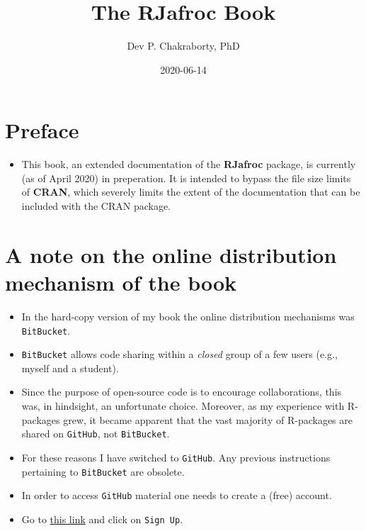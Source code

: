 \documentclass[
]{book}
\title{The RJafroc Book}
\author{Dev P. Chakraborty, PhD}
\date{2020-06-14}
\providecommand{\tightlist}{%
  \setlength{\itemsep}{0pt}\setlength{\parskip}{0pt}}
\begin{document}
\maketitle

{
\setcounter{tocdepth}{1}
\tableofcontents
}
\hypertarget{preface}{%
\chapter*{Preface}\label{preface}}

\begin{itemize}
\tightlist
\item
  This book, an extended documentation of the \textbf{RJafroc} package, is currently (as of April 2020) in preperation. It is intended to bypass the file size limits of \textbf{CRAN}, which severely limits the extent of the documentation that can be included with the CRAN package.
\end{itemize}

\hypertarget{a-note-on-the-online-distribution-mechanism-of-the-book}{%
\chapter*{A note on the online distribution mechanism of the book}\label{a-note-on-the-online-distribution-mechanism-of-the-book}}

\begin{itemize}
\tightlist
\item
  In the hard-copy version of my book \citep{RN2680} the online distribution mechanisms was \texttt{BitBucket}.
\item
  \texttt{BitBucket} allows code sharing within a \emph{closed} group of a few users (e.g., myself and a student).
\item
  Since the purpose of open-source code is to encourage collaborations, this was, in hindsight, an unfortunate choice. Moreover, as my experience with R-packages grew, it became apparent that the vast majority of R-packages are shared on \texttt{GitHub}, not \texttt{BitBucket}.
\item
  For these reasons I have switched to \texttt{GitHub}. Any previous instructions pertaining to \texttt{BitBucket} are obsolete.
\item
  In order to access \texttt{GitHub} material one needs to create a (free) account.
\item
  Go to \href{https://github.com}{this link} and click on \texttt{Sign\ Up}.
\end{itemize}
\end{document}
